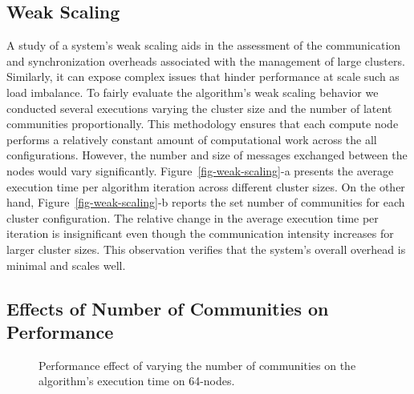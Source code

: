 \subsection{Weak Scaling}

\begin{figure*}[t] %
  \centering
  \caption{(a) Average execution time per algorithm iteration varying
  the number of latent communities proportionally to the number of compute
  nodes. (b) The exact number of communities used for each data point in (a).}
  \label{fig-weak-scaling}
\end{figure*}

A study of a system's weak scaling aids in the assessment of the communication
and synchronization overheads associated with the management of large clusters.
Similarly, it can expose complex issues that hinder performance at scale such
as load imbalance. To fairly evaluate the algorithm's weak scaling behavior we
conducted several executions varying the cluster size and the number of latent
communities proportionally. This methodology ensures that each compute node
performs a relatively constant amount of computational work across the all
configurations. However, the number and size of messages exchanged between the
nodes would vary significantly. Figure~\ref{fig-weak-scaling}-a presents the
average execution
time per algorithm iteration across different cluster sizes. On the other hand,
Figure~\ref{fig-weak-scaling}-b reports the set number of communities for each
cluster configuration. The relative change in the average execution time per
iteration is insignificant even though the communication intensity increases
for larger cluster sizes. This observation verifies that the system's overall
overhead is minimal and scales well.

\subsection{Effects of Number of Communities on Performance}

\begin{figure}[t] %
  \centering
  \caption{Performance effect of varying the number of communities on the
    algorithm's execution time on 64-nodes.}
  \label{fig-k}
\end{figure}


